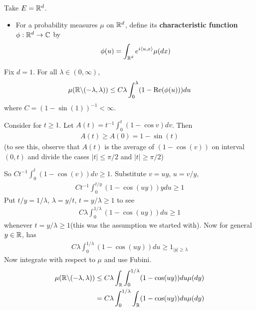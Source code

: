 \documentclass[12pt,a4paper]{report}
\newenvironment{proof}
{\begin{changemargin}{1cm}{0.5cm} 
	}%
	{\end{changemargin}
}
\begin{document}
Take $E = \mathbb{R}^d$. 
\begin{itemize}
\item For a probability measures $\mu$ on $\mathbb{R}^d$, define its \textbf{characteristic function} $\phi : \mathbb{R}^d \rightarrow \mathbb{C}$ by
\begin{align*}
\phi(u) = \int_{\mathbb{R}^d} e^{i \langle u, x\rangle} \mu(dx)
\end{align*}
\end{itemize}
\s

 Fix $d=1$. For all $\lambda \in (0,\infty)$,
\begin{align*}
\mu(\mathbb{R} \backslash (-\lambda, \lambda)) \leq C\lambda \int_{0}^{\lambda} (1- \text{Re}(\phi(u))) du
\end{align*}
where $C = (1- \sin(1))^{-1} < \infty$.
\begin{proof}
\pf Consider for $t\geq 1$. Let $A(t) = t^{-1} \int_0^t (1-\cos v) dv$. Then
\begin{align*}
A(t) \geq A(0) = 1-\sin (t) 
\end{align*}
(to see this, observe that $A(t)$ is the average of $(1-\cos(v))$ on interval $(0,t)$ and divide the cases $|t| \leq \pi /2$ and $|t| \geq \pi/2$)

So $Ct^{-1} \int_0^t (1- \cos(v)) dv \geq 1$. Substitute $v = uy$, $u=v/y$,
\begin{align*}
Ct^{-1} \int_0^{t/y} (1- \cos(uy)) y du \geq 1
\end{align*}
Put $t/y = 1/\lambda$, $\lambda = y/t$, $t= y/\lambda \geq 1$ to see
\begin{align*}
C\lambda \int_{0}^{1/\lambda} (1- \cos (uy)) du \geq 1
\end{align*}
whenever $t=y/\lambda \geq 1$(this was the assumption we started with). Now for general $y \in \mathbb{R}$, has
\begin{align*}
C\lambda \int_{0}^{1/\lambda} (1- \cos (uy)) du \geq 1_{|y| \geq \lambda}
\end{align*}
Now integrate with respect to $\mu$ and use Fubini.
\begin{align*}
\mu(\mathbb{R} \backslash (-\lambda, \lambda)) &\leq C\lambda \int_{\mathbb{R}} \int_0^{1/\lambda} (1- \cos (uy)) du \mu(dy) \\
&= C\lambda \int_0^{1/\lambda} \int_{\mathbb{R}} (1- \cos(uy)) du \mu(dy)
\end{align*}

\eop
\end{proof}
\s

\newday
\end{document}
